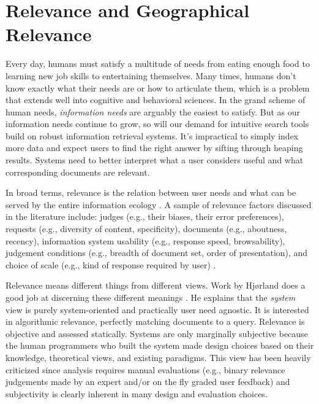 \section{Relevance and Geographical Relevance}

Every day, humans must satisfy a multitude of needs from eating enough food to learning new job skills to entertaining themselves. Many times, humans don't know exactly what their needs are or how to articulate them, which is a problem that extends well into cognitive and behavioral sciences. In the grand scheme of human needs, \emph{information needs} are arguably the easiest to satisfy. But as our information needs continue to grow, so will our demand for intuitive search tools build on robust information retrieval systems. It's impractical to simply index more data and expect users to find the right answer by sifting through heaping results. Systems need to better interpret what a user considers useful and what corresponding documents are relevant.

In broad terms, relevance is the relation between user needs and what can be served by the entire information ecology \cite{Hjorland2010}. A sample of relevance factors discussed in the literature include: judges (e.g., their biases, their error preferences), requests (e.g., diversity of content, specificity), documents (e.g., aboutness, recency), information system usability (e.g., response speed, browsability), judgement conditions (e.g., breadth of document set, order of presentation), and choice of scale (e.g., kind of response required by user) \cite{Schamber1994}.

Relevance means different things from different views. Work by Hjørland does a good job at discerning these different meanings \cite{Hjorland2010}. He explains that the \emph{system} view is purely system-oriented and practically user need agnostic. It is interested in algorithmic relevance, perfectly matching documents to a query. Relevance is objective and assessed statically. Systems are only marginally subjective because the human programmers who built the system made design choices based on their knowledge, theoretical views, and existing paradigms. This view has been heavily criticized since analysis requires manual evaluations (e.g., binary relevance judgements made by an expert and/or on the fly graded user feedback) and subjectivity is clearly inherent in many design and evaluation choices.

